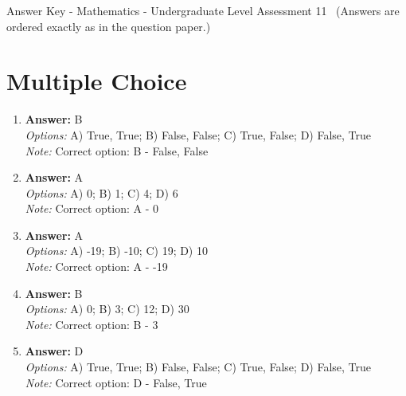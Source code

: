 \documentclass[12pt]{article}
\begin{document}
\begin{center}
Answer Key - Mathematics - Undergraduate Level Assessment 11 \
\small (Answers are ordered exactly as in the question paper.)
\end{center}

\section*{Multiple Choice}
\begin{enumerate}[label=\arabic*.]
\item \textbf{Answer:} B
\\ \textit{Options:} A) True, True; B) False, False; C) True, False; D) False, True
\\ \textit{Note:} Correct option: B - False, False
\item \textbf{Answer:} A
\\ \textit{Options:} A) 0; B) 1; C) 4; D) 6
\\ \textit{Note:} Correct option: A - 0
\item \textbf{Answer:} A
\\ \textit{Options:} A) -19; B) -10; C) 19; D) 10
\\ \textit{Note:} Correct option: A - -19
\item \textbf{Answer:} B
\\ \textit{Options:} A) 0; B) 3; C) 12; D) 30
\\ \textit{Note:} Correct option: B - 3
\item \textbf{Answer:} D
\\ \textit{Options:} A) True, True; B) False, False; C) True, False; D) False, True
\\ \textit{Note:} Correct option: D - False, True
\end{enumerate}
\end{document}
